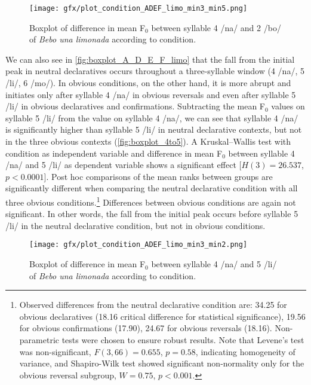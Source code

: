 \begin{figure}
	\texttt{[image: gfx/plot\_condition\_ADEF\_limo\_min3\_min5.png]}
	\caption[Boxplot of difference in mean F$_0$ between syllable 4 and 2 of \textit{Bebo una limonada}]{Boxplot of difference in mean F$_0$ between syllable 4 /na/ and 2 /bo/ of \textit{Bebo una limonada} according to condition.}\label{fig:boxplot_4to2}
\end{figure}

We can also see in \autoref{fig:boxplot_A_D_E_F_limo} that the fall from the initial peak in neutral declaratives occurs throughout a three-syllable window (4 /na/, 5 /li/, 6 /mo/). In obvious conditions, on the other hand, it is more abrupt and initiates only after syllable 4 /na/ in obvious reversals and even after syllable 5 /li/ in obvious declaratives and confirmations. Subtracting the mean F$_0$ values on syllable 5 /li/ from the value on syllable 4 /na/, we can see that syllable 4 /na/ is significantly higher than syllable 5 /li/ in neutral declarative contexts, but not in the three obvious contexts (\autoref{fig:boxplot_4to5}). A Kruskal–Wallis test with condition as independent variable and difference in mean F$_0$ between syllable 4 /na/ and 5 /li/ as dependent variable shows a significant effect [$H(3) = 26.537$, $p<0.0001$]. Post hoc comparisons of the mean ranks between groups are significantly different when comparing the neutral declarative condition with all three obvious conditions.\footnote{Observed differences from the neutral declarative condition are: 34.25 for obvious declaratives (18.16 critical difference for statistical significance), 19.56 for obvious confirmations (17.90), 24.67 for obvious reversals (18.16). Non-parametric tests were chosen to ensure robust results. Note that Levene’s test was non-significant, $F(3,66) = 0.655$, $p = 0.58$, indicating homogeneity of variance, and Shapiro-Wilk test showed significant non-normality only for the obvious reversal subgroup, $W = 0.75$, $p<0.001$.} Differences between obvious conditions are again not significant. In other words, the fall from the initial peak occurs before syllable 5 /li/ in the neutral declarative condition, but not in obvious conditions.

\begin{figure}
	\texttt{[image: gfx/plot\_condition\_ADEF\_limo\_min3\_min2.png]}
	\caption[Boxplot of difference in mean F$_0$ between syllable 4 and 5 of \textit{Bebo una limonada}]{Boxplot of difference in mean F$_0$ between syllable 4 /na/ and 5 /li/ of \textit{Bebo una limonada} according to condition.}\label{fig:boxplot_4to5}
\end{figure}

